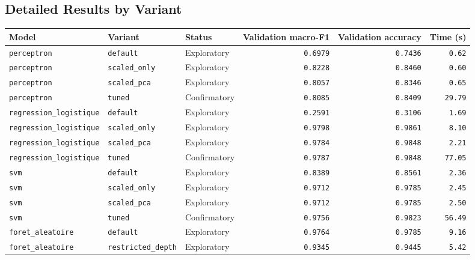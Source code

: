 \subsection{Detailed Results by Variant}

\begin{table}[H]
\centering
\begin{tabular}{|l|l|l|r|r|r|}
\hline
\textbf{Model} & \textbf{Variant} & \textbf{Status} & \textbf{Validation macro-F1} & \textbf{Validation accuracy} & \textbf{Time (s)} \\
\hline
\texttt{perceptron} & \texttt{default} & Exploratory & \texttt{0.6979} & \texttt{0.7436} & \texttt{0.62} \\
\texttt{perceptron} & \texttt{scaled\_only} & Exploratory & \texttt{0.8228} & \texttt{0.8460} & \texttt{0.60} \\
\texttt{perceptron} & \texttt{scaled\_pca} & Exploratory & \texttt{0.8057} & \texttt{0.8346} & \texttt{0.65} \\
\texttt{perceptron} & \texttt{tuned} & Confirmatory & \texttt{0.8085} & \texttt{0.8409} & \texttt{29.79} \\
\texttt{regression\_logistique} & \texttt{default} & Exploratory & \texttt{0.2591} & \texttt{0.3106} & \texttt{1.69} \\
\texttt{regression\_logistique} & \texttt{scaled\_only} & Exploratory & \texttt{0.9798} & \texttt{0.9861} & \texttt{8.10} \\
\texttt{regression\_logistique} & \texttt{scaled\_pca} & Exploratory & \texttt{0.9784} & \texttt{0.9848} & \texttt{2.21} \\
\texttt{regression\_logistique} & \texttt{tuned} & Confirmatory & \texttt{0.9787} & \texttt{0.9848} & \texttt{77.05} \\
\texttt{svm} & \texttt{default} & Exploratory & \texttt{0.8389} & \texttt{0.8561} & \texttt{2.36} \\
\texttt{svm} & \texttt{scaled\_only} & Exploratory & \texttt{0.9712} & \texttt{0.9785} & \texttt{2.45} \\
\texttt{svm} & \texttt{scaled\_pca} & Exploratory & \texttt{0.9712} & \texttt{0.9785} & \texttt{2.50} \\
\texttt{svm} & \texttt{tuned} & Confirmatory & \texttt{0.9756} & \texttt{0.9823} & \texttt{56.49} \\
\texttt{foret\_aleatoire} & \texttt{default} & Exploratory & \texttt{0.9764} & \texttt{0.9785} & \texttt{9.16} \\
\texttt{foret\_aleatoire} & \texttt{restricted\_depth} & Exploratory & \texttt{0.9345} & \texttt{0.9445} & \texttt{5.42} \\

\end{tabular}
\end{table}
